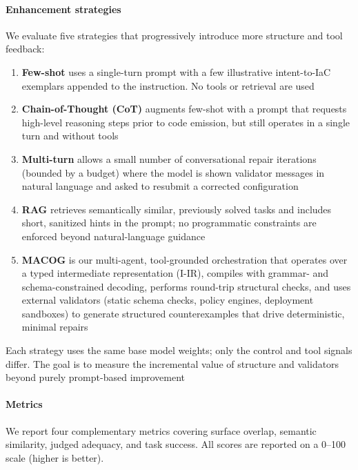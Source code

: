 \documentclass[acmsmall,screen,review,anonymous]{acmart}
\begin{document}
\paragraph{Enhancement strategies}
We evaluate five strategies that progressively introduce more structure and tool feedback:
\begin{enumerate}
  \item \textbf{Few-shot} uses a single-turn prompt with a few illustrative intent-to-IaC exemplars appended to the instruction. No tools or retrieval are used
  \item \textbf{Chain-of-Thought (CoT)} augments few-shot with a prompt that requests high-level reasoning steps prior to code emission, but still operates in a single turn and without tools
  \item \textbf{Multi-turn} allows a small number of conversational repair iterations (bounded by a budget) where the model is shown validator messages in natural language and asked to resubmit a corrected configuration
  \item \textbf{RAG} retrieves semantically similar, previously solved tasks and includes short, sanitized hints in the prompt; no programmatic constraints are enforced beyond natural-language guidance
  \item \textbf{MACOG} is our multi-agent, tool-grounded orchestration that operates over a typed intermediate representation (I-IR), compiles with grammar- and schema-constrained decoding, performs round-trip structural checks, and uses external validators (static schema checks, policy engines, deployment sandboxes) to generate structured counterexamples that drive deterministic, minimal repairs
\end{enumerate}
Each strategy uses the same base model weights; only the control and tool signals differ. The goal is to measure the incremental value of structure and validators beyond purely prompt-based improvement


\paragraph{Metrics}
We report four complementary metrics covering surface overlap, semantic similarity, judged adequacy, and task success. All scores are reported on a 0–100 scale (higher is better).
\end{document}
